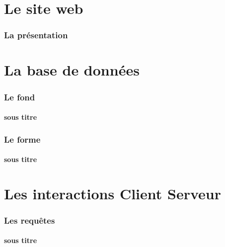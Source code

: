 \documentclass{beamer}
\begin{document}

\section{Le site web}


\begin{frame}
\frametitle{La présentation}

\end{frame}


\section{La base de données}


\begin{frame}

\frametitle{Le fond}
\framesubtitle{sous titre}

\end{frame}



\begin{frame}

\frametitle{Le forme}
\framesubtitle{sous titre}

\end{frame}



\section{Les interactions Client Serveur}


\begin{frame}

\frametitle{Les requêtes}
\framesubtitle{sous titre}

\end{frame}
\end{document}
